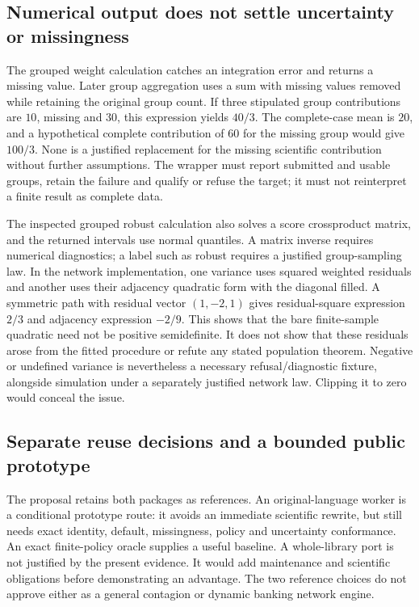 \subsection{Numerical output does not settle uncertainty or missingness}
The grouped weight calculation catches an integration error and returns a
missing value. Later group aggregation uses a sum with missing values removed
while retaining the original group count. If three stipulated group
contributions are $10$, missing and $30$, this expression yields $40/3$. The
complete-case mean is $20$, and a hypothetical complete contribution of $60$
for the missing group would give $100/3$. None is a justified replacement for
the missing scientific contribution without further assumptions. The wrapper
must report submitted and usable groups, retain the failure and qualify or
refuse the target; it must not reinterpret a finite result as complete data.
\citep{exec24_interference_inferference,exec24_interference_reference}

The inspected grouped robust calculation also solves a score crossproduct
matrix, and the returned intervals use normal quantiles. A matrix inverse
requires numerical diagnostics; a label such as robust requires a justified
group-sampling law. In the network implementation, one variance uses squared
weighted residuals and another uses their adjacency quadratic form with the
diagonal filled. A symmetric path with residual vector $(1,-2,1)$ gives
residual-square expression $2/3$ and adjacency expression $-2/9$. This shows
that the bare finite-sample quadratic need not be positive semidefinite. It
does not show that these residuals arose from the fitted procedure or refute
any stated population theorem. Negative or undefined variance is nevertheless
a necessary refusal/diagnostic fixture, alongside simulation under a separately
justified network law. Clipping it to zero would conceal the issue.
\citep{exec24_interference_mossspider,exec24_interference_inferference,exec24_interference_reference}

\subsection{Separate reuse decisions and a bounded public prototype}
The proposal retains both packages as references. An original-language worker
is a conditional prototype route: it avoids an immediate scientific rewrite,
but still needs exact identity, default, missingness, policy and uncertainty
conformance. An exact finite-policy oracle supplies a useful baseline. A
whole-library port is not justified by the present evidence. It would add
maintenance and scientific obligations before demonstrating an advantage.
The two reference choices do not approve either as a general contagion or
dynamic banking network engine.
\citep{exec24_interference_reference}

